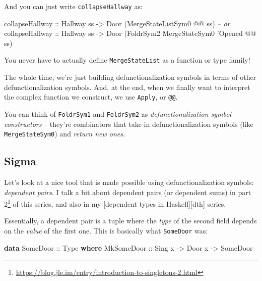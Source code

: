 \documentclass[]{article}
\newenvironment{Shaded}{}{}
\newcommand{\CommentTok}[1]{\textcolor[rgb]{0.38,0.63,0.69}{\textit{#1}}}
\newcommand{\DataTypeTok}[1]{\textcolor[rgb]{0.56,0.13,0.00}{#1}}
\newcommand{\FunctionTok}[1]{\textcolor[rgb]{0.02,0.16,0.49}{#1}}
\newcommand{\KeywordTok}[1]{\textcolor[rgb]{0.00,0.44,0.13}{\textbf{#1}}}
\newcommand{\NormalTok}[1]{#1}
\newcommand{\OtherTok}[1]{\textcolor[rgb]{0.00,0.44,0.13}{#1}}
\renewcommand{\href}[2]{#2\footnote{\url{#1}}}
\begin{document}
And you can just write \texttt{collapseHallway} as:

\begin{Shaded}
\begin{Highlighting}[]
\OtherTok{collapseHallway ::} \DataTypeTok{Hallway}\NormalTok{ ss }\OtherTok{->} \DataTypeTok{Door}\NormalTok{ (}\DataTypeTok{MergeStateListSym0} \FunctionTok{@@}\NormalTok{ ss)}
\CommentTok{-- or}
\OtherTok{collapseHallway ::} \DataTypeTok{Hallway}\NormalTok{ ss }\OtherTok{->} \DataTypeTok{Door}\NormalTok{ (}\DataTypeTok{FoldrSym2} \DataTypeTok{MergeStateSym0}\NormalTok{ '}\DataTypeTok{Opened} \FunctionTok{@@}\NormalTok{ ss)}
\end{Highlighting}
\end{Shaded}

You never have to actually define \texttt{MergeStateList} as a function or type
family!

The whole time, we're just building defunctionalization symbols in terms of
other defunctionalization symbols. And, at the end, when we finally want to
interpret the complex function we construct, we use \texttt{Apply}, or
\texttt{@@}.

You can think of \texttt{FoldrSym1} and \texttt{FoldrSym2} as
\emph{defunctionalization symbol constructors} -- they're combinators that take
in defunctionalization symbols (like \texttt{MergeStateSym0}) and \emph{return
new ones}.

\hypertarget{sigma}{%
\subsection{Sigma}\label{sigma}}

Let's look at a nice tool that is made possible using defunctionalization
symbols: \emph{dependent pairs}. I talk a bit about dependent pairs (or
dependent sums) in
\href{https://blog.jle.im/entry/introduction-to-singletons-2.html}{part 2} of
this series, and also in my {[}dependent types in Haskell{]}{[}dth{]} series.

Essentially, a dependent pair is a tuple where the \emph{type} of the second
field depends on the \emph{value} of the first one. This is basically what
\texttt{SomeDoor} was:

\begin{Shaded}
\begin{Highlighting}[]
\KeywordTok{data} \DataTypeTok{SomeDoor}\OtherTok{ ::} \DataTypeTok{Type} \KeywordTok{where}
    \DataTypeTok{MkSomeDoor}\OtherTok{ ::} \DataTypeTok{Sing}\NormalTok{ x }\OtherTok{->} \DataTypeTok{Door}\NormalTok{ x }\OtherTok{->} \DataTypeTok{SomeDoor}
\end{Highlighting}
\end{Shaded}
\end{document}
